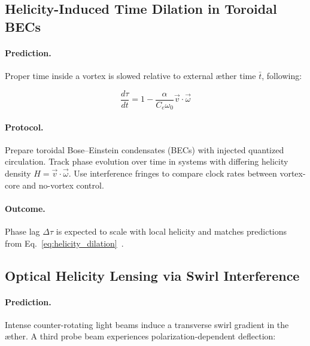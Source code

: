\documentclass[12pt]{article}
\begin{document}
            \subsection{Helicity-Induced Time Dilation in Toroidal BECs}
        
            \paragraph{Prediction.}
            Proper time inside a vortex is slowed relative to external æther time \( \bar{t} \), following:
        
            \begin{equation}
            \frac{d\tau}{dt} = 1 - \frac{\alpha}{C_e \omega_0} \vec{v} \cdot \vec{\omega}
            \label{eq:helicity_dilation}
            \end{equation}
        
            \paragraph{Protocol.}
            Prepare toroidal Bose–Einstein condensates (BECs) with injected quantized circulation. Track phase evolution over time in systems with differing helicity density \( H = \vec{v} \cdot \vec{\omega} \). Use interference fringes to compare clock rates between vortex-core and no-vortex control.
        
            \paragraph{Outcome.}
            Phase lag \( \Delta \tau \) is expected to scale with local helicity and matches predictions from Eq.~\ref{eq:helicity_dilation}~\cite{volovik2003universe, ranada1990topological}.
        
            \subsection{Optical Helicity Lensing via Swirl Interference}
        
            \paragraph{Prediction.}
            Intense counter-rotating light beams induce a transverse swirl gradient in the æther. A third probe beam experiences polarization-dependent deflection:
        
\end{document}
